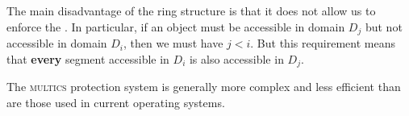 The main disadvantage of the ring structure is that it does not allow us to enforce the .
In particular, if an object must be accessible in domain $D_{j}$ but not accessible in domain $D_{i}$, then we must have $j < i$.
But this requirement means that \textbf{every} segment accessible in $D_{i}$ is also accessible in $D_{j}$.

The \textsc{multics} protection system is generally more complex and less efficient than are those used in current operating systems.

